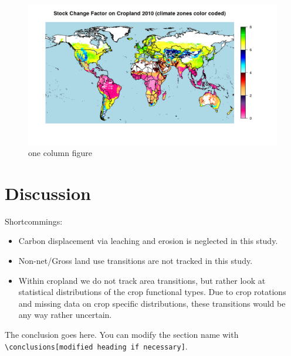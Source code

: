 \documentclass[gc, manuscript]{copernicus}
\begin{document}
\begin{figure}
\includegraphics[width=12cm]{images/maps/CShare_4ColorClimates} \caption{one column figure}\label{fig:unnamed-chunk-12}
\end{figure}
\newpage

\section{Discussion}

Shortcommings:

\begin{itemize}
\item
  Carbon displacement via leaching and erosion is neglected in this
  study.
\item
  Non-net/Gross land use transitions are not tracked in this study.
\item
  Within cropland we do not track area transitions, but rather look at
  statistical distributions of the crop functional types. Due to crop
  rotations and missing data on crop specific distributions, these
  transitions would be any way rather uncertain. \newpage
\end{itemize}

\conclusions

The conclusion goes here. You can modify the section name with
\texttt{\textbackslash{}conclusions{[}modified\ heading\ if\ necessary{]}}.
\newpage








\appendix
\end{document}
